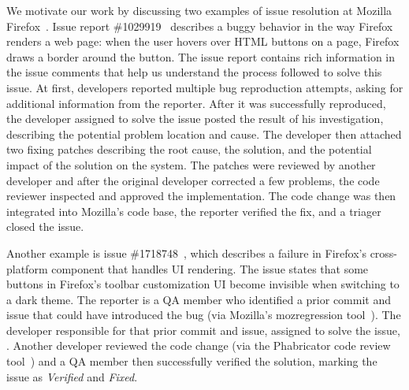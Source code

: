 We motivate our work by discussing two examples of issue resolution at Mozilla Firefox~\cite{mozilla-firefox}. 
Issue report \#1029919~\cite{firefox-bug-1029919} describes a buggy behavior in the way Firefox renders a web page: when the user hovers over HTML buttons on a page, Firefox draws a border around the button.
The issue report contains rich information in the issue comments that help us understand the process followed to solve this issue. 
At first, developers reported multiple bug reproduction attempts, asking for additional information from the reporter. After it was successfully reproduced, the developer assigned to solve the issue posted the result of his investigation, describing the potential problem location and cause. The developer then attached two fixing patches describing the root cause,  the solution, and the potential impact of the solution on the system. The patches were reviewed by another developer and after the original developer corrected a few problems, the code reviewer inspected and approved the implementation. The code change was then integrated into Mozilla's code base, the reporter verified the fix, and a triager closed the issue. 



Another example is issue \#1718748~\cite{firefox-bug-1718748}, which describes a failure in Firefox's cross-platform component %
that handles UI rendering. 
The issue states that some buttons in Firefox's toolbar customization UI become invisible when switching to a dark theme. 
The reporter is a QA member who identified a prior commit and issue that could have introduced the bug (via Mozilla's mozregression tool~\cite{mozregression}). The developer responsible for that prior commit and issue, assigned to solve the issue, . Another developer reviewed the code change (via the Phabricator code review tool~\cite{phabricator}) and a QA member then successfully verified the solution, marking the issue as \textit{Verified} and \textit{Fixed}.


